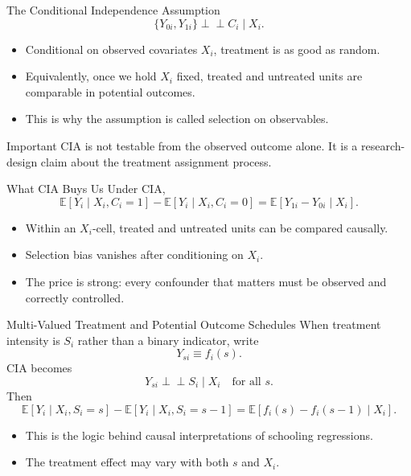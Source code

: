 \documentclass[11pt,aspectratio=169]{beamer}
\newcommand{\E}{\mathbb{E}}
\newcommand{\indep}{\perp\!\!\!\perp}
\begin{document}
\begin{frame}{The Conditional Independence Assumption}
  \[
    \{Y_{0i},Y_{1i}\}\indep C_i \mid X_i.
  \]
  \begin{itemize}
    \item Conditional on observed covariates \(X_i\), treatment is as good as random.
    \item Equivalently, once we hold \(X_i\) fixed, treated and untreated units are comparable in potential outcomes.
    \item This is why the assumption is called selection on observables.
  \end{itemize}
  \begin{block}{Important}
    CIA is not testable from the observed outcome alone. It is a research-design claim about the treatment assignment process.
  \end{block}
\end{frame}

\begin{frame}{What CIA Buys Us}
  Under CIA,
  \[
    \E[Y_i \mid X_i,C_i=1]-\E[Y_i \mid X_i,C_i=0]
    =
    \E[Y_{1i}-Y_{0i} \mid X_i].
  \]
  \begin{itemize}
    \item Within an \(X_i\)-cell, treated and untreated units can be compared causally.
    \item Selection bias vanishes after conditioning on \(X_i\).
    \item The price is strong: every confounder that matters must be observed and correctly controlled.
  \end{itemize}
\end{frame}

\begin{frame}{Multi-Valued Treatment and Potential Outcome Schedules}
  When treatment intensity is \(S_i\) rather than a binary indicator, write
  \[
    Y_{si}\equiv f_i(s).
  \]
  CIA becomes
  \[
    Y_{si}\indep S_i \mid X_i \quad \text{for all } s.
  \]
  Then
  \[
    \E[Y_i \mid X_i,S_i=s]-\E[Y_i \mid X_i,S_i=s-1]
    =
    \E[f_i(s)-f_i(s-1)\mid X_i].
  \]
  \begin{itemize}
    \item This is the logic behind causal interpretations of schooling regressions.
    \item The treatment effect may vary with both \(s\) and \(X_i\).
  \end{itemize}
\end{frame}
\end{document}

